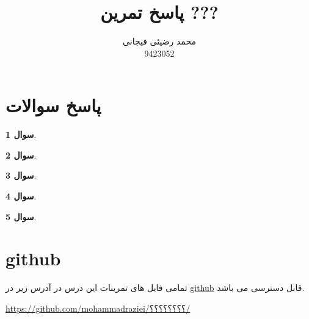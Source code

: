 \documentclass[12pt]{article}
\title{پاسخ تمرین ???}
\author{محمد رضیئی فیجانی\\ 9423052}
\newtheorem{question}{سوال}
\begin{document}
\maketitle

\section{پاسخ سوالات}\label{chpt1}
\begin{question}
	
\end{question}
\begin{question}

\end{question}
\begin{question}
	
\end{question}
\begin{question}
	
\end{question}
\begin{question}
	
\end{question}

\section{github}\label{chpt2}
تمامی فایل های تمرینات این درس در آدرس زیر در 
\href{https://github.com/mohammadraziei/؟؟؟؟؟؟؟؟؟/}{github}
قابل دسترسی می باشد.

\begin{latin}
\begin{center}
{\href{https://github.com/mohammadraziei/؟؟؟؟؟؟؟؟؟/}{https://github.com/mohammadraziei/؟؟؟؟؟؟؟؟/}}
\end{center}
\end{latin}
\end{document}
